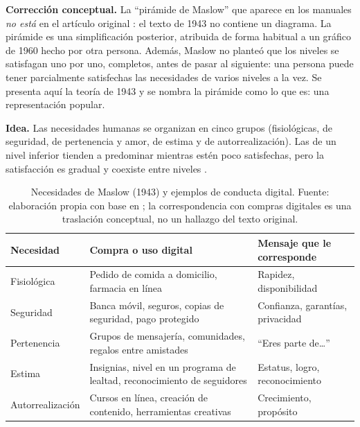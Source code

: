 \begin{cajaAtencion}
\textbf{Corrección conceptual.} La \enquote{pirámide de Maslow} que aparece en
los manuales \emph{no está} en el artículo original \parencite{maslow1943}: el
texto de 1943 no contiene un diagrama. La pirámide es una simplificación
posterior, atribuida de forma habitual a un gráfico de 1960 hecho por otra
persona. Además, Maslow no planteó que los niveles se satisfagan uno por uno,
completos, antes de pasar al siguiente: una persona puede tener parcialmente
satisfechas las necesidades de varios niveles a la vez. Se presenta aquí
la teoría de 1943 y se nombra la pirámide como lo que es: una representación
popular.
\end{cajaAtencion}

\textbf{Idea.} Las necesidades humanas se organizan en cinco grupos
(fisiológicas, de seguridad, de pertenencia y amor, de estima y de
autorrealización). Las de un nivel inferior tienden a predominar mientras estén
poco satisfechas, pero la satisfacción es gradual y coexiste entre niveles
\parencite{maslow1943}.

\begin{table}[!htb]
\centering
\footnotesize
\begin{tabular}{@{}>{\raggedright}p{2.8cm}>{\raggedright}p{4.3cm}>{\raggedright\arraybackslash}p{5.0cm}@{}}
\toprule
Necesidad & Compra o uso digital & Mensaje que le corresponde \\
\midrule
Fisiológica & Pedido de comida a domicilio, farmacia en línea & Rapidez, disponibilidad \\
Seguridad & Banca móvil, seguros, copias de seguridad, pago protegido & Confianza, garantías, privacidad \\
Pertenencia & Grupos de mensajería, comunidades, regalos entre amistades & \enquote{Eres parte de\ldots} \\
Estima & Insignias, nivel en un programa de lealtad, reconocimiento de seguidores & Estatus, logro, reconocimiento \\
Autorrealización & Cursos en línea, creación de contenido, herramientas creativas & Crecimiento, propósito \\
\bottomrule
\end{tabular}
\caption{Necesidades de Maslow (1943) y ejemplos de conducta digital. Fuente:
elaboración propia con base en \textcite{maslow1943}; la correspondencia con
compras digitales es una traslación conceptual, no un hallazgo del texto
original.}
\label{tab:cap09-maslow}
\end{table}

